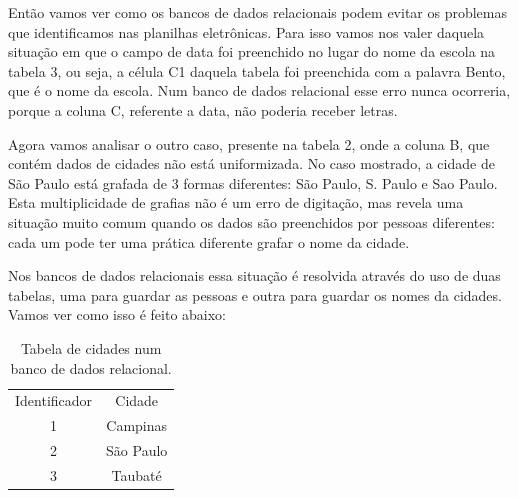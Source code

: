\documentclass[
12pt,		%
openright,	%
twoside,  %
a4paper,			%
chapter=TITLE,		%
english,			%
french,				%
spanish,			%
brazil				%
]{USPSC-classe/USPSC}
\begin{document}
Ent\~ao vamos ver como os bancos de dados relacionais podem evitar os problemas que identificamos nas planilhas eletr\^onicas. Para isso vamos nos valer daquela situa\c{c}\~ao em que o campo de data foi preenchido no lugar do nome da escola na tabela 3, ou seja, a c\'elula C1 daquela tabela foi preenchida com a palavra \textquotedbl Bento\textquotedbl , que \'e o nome da escola. Num banco de dados relacional esse erro nunca ocorreria, porque a coluna C, referente a data, n\~ao poderia receber letras.

















Agora vamos analisar o outro caso, presente na tabela 2, onde a coluna B, que cont\'em dados de cidades n\~ao est\'a uniformizada. No caso mostrado, a cidade de S\~ao Paulo est\'a grafada de 3 formas diferentes: S\~ao Paulo, S. Paulo e Sao Paulo. Esta multiplicidade de grafias n\~ao \'e um erro de digita\c{c}\~ao, mas revela uma situa\c{c}\~ao muito comum quando os dados s\~ao preenchidos por pessoas diferentes: cada um pode ter uma pr\'atica diferente grafar o nome da cidade.

















Nos bancos de dados relacionais essa situa\c{c}\~ao \'e resolvida atrav\'es do uso de duas tabelas, uma para guardar as pessoas e outra para guardar os nomes da cidades. Vamos ver como isso \'e feito abaixo:





















\begin{table}[htb]
\tiny
\caption{\label{e4d91173469576e32f3571663aaeb94e34415b3e}Tabela de cidades num banco de dados relacional.}

\centering
\begin{tabular}{|c|c|}
\hline
Identificador  &  Cidade \\
1  &  Campinas \\
2  &  S\~ao Paulo \\
3  &  Taubat\'e \\
\hline
\end{tabular}
\end{table}
\end{document}
